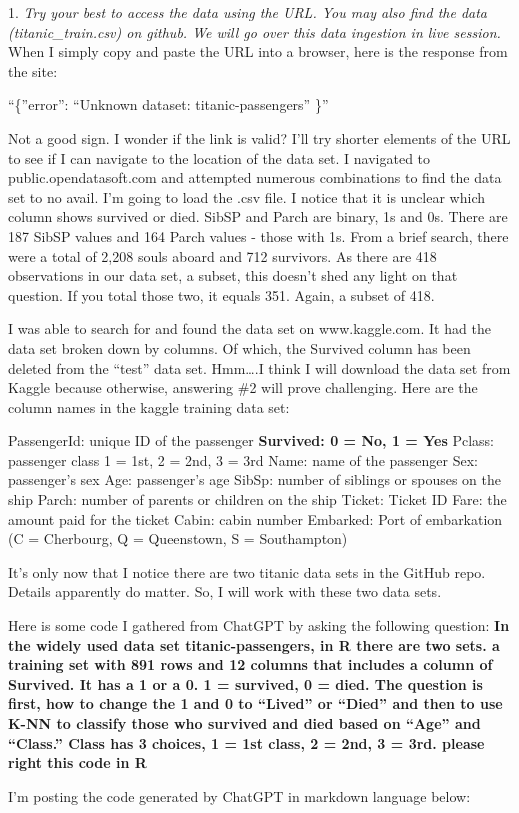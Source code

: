 \documentclass[
  ignorenonframetext,
]{beamer}
\begin{document}
\begin{frame}[fragile]
\begin{block}{1. \emph{Try your best to access the data using the URL.
You may also find the data (titanic\_train.csv) on github. We will go
over this data ingestion in live session.}}
When I simply copy and paste the URL into a browser, here is the
response from the site:

``\{''error'': ``Unknown dataset: titanic-passengers'' \}''

Not a good sign. I wonder if the link is valid? I'll try shorter
elements of the URL to see if I can navigate to the location of the data
set. I navigated to public.opendatasoft.com and attempted numerous
combinations to find the data set to no avail. I'm going to load the
.csv file. I notice that it is unclear which column shows survived or
died. SibSP and Parch are binary, 1s and 0s. There are 187 SibSP values
and 164 Parch values - those with 1s. From a brief search, there were a
total of 2,208 souls aboard and 712 survivors. As there are 418
observations in our data set, a subset, this doesn't shed any light on
that question. If you total those two, it equals 351. Again, a subset of
418.

I was able to search for and found the data set on www.kaggle.com. It
had the data set broken down by columns. Of which, the Survived column
has been deleted from the ``test'' data set. Hmm\ldots.I think I will
download the data set from Kaggle because otherwise, answering \#2 will
prove challenging. Here are the column names in the kaggle training data
set:

PassengerId: unique ID of the passenger \textbf{Survived: 0 = No, 1 =
Yes} Pclass: passenger class 1 = 1st, 2 = 2nd, 3 = 3rd Name: name of the
passenger Sex: passenger's sex Age: passenger's age SibSp: number of
siblings or spouses on the ship Parch: number of parents or children on
the ship Ticket: Ticket ID Fare: the amount paid for the ticket Cabin:
cabin number Embarked: Port of embarkation (C = Cherbourg, Q =
Queenstown, S = Southampton)

It's only now that I notice there are two titanic data sets in the
GitHub repo. Details apparently do matter. So, I will work with these
two data sets.

Here is some code I gathered from ChatGPT by asking the following
question: \textbf{In the widely used data set titanic-passengers, in R
there are two sets. a training set with 891 rows and 12 columns that
includes a column of Survived. It has a 1 or a 0. 1 = survived, 0 =
died. The question is first, how to change the 1 and 0 to ``Lived'' or
``Died'' and then to use K-NN to classify those who survived and died
based on ``Age'' and ``Class.'' Class has 3 choices, 1 = 1st class, 2 =
2nd, 3 = 3rd. please right this code in R}

I'm posting the code generated by ChatGPT in markdown language below:
\end{block}
\end{frame}
\end{document}
